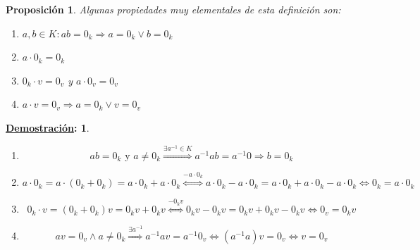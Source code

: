 \documentclass[10pt,a4paper,openright]{book}
\theoremstyle{break}
\newtheorem*{prop}{Proposición}
\newtheorem*{demo}{\underline{Demostración}:}
\begin{document}
\begin{prop}
Algunas propiedades muy elementales de esta definición son:
\begin{enumerate}
\item $a,b\in K: ab=0_k\Rightarrow a=0_k \vee b=0_k$

\item $a\cdot 0_k=0_k$

\item $0_k\cdot v=0_v$ y $a\cdot 0_v=0_v$

\item $a\cdot v=0_v\Rightarrow a=0_k \vee v=0_v$
\end{enumerate}
\end{prop}
\begin{demo}
\begin{enumerate}
\item 
$$ab=0_k\mbox{ y } a\neq 0_k \stackrel{\exists a^{-1}\in K}{\Rightarrow} a^{-1}ab=a^{-1}0\Rightarrow b=0_k$$

\item
$$a\cdot 0_k=a\cdot (0_k+0_k)=a\cdot 0_k+a\cdot 0_k\stackrel{-a\cdot 0_k}{\Leftrightarrow}a\cdot 0_k-a\cdot 0_k=a\cdot 0_k+a\cdot 0_k-a\cdot 0_k\Leftrightarrow 0_k=a\cdot 0_k$$

\item
$$0_k\cdot v=(0_k+0_k)v=0_kv+0_kv\stackrel{-0_kv}{\Leftrightarrow} 0_kv-0_kv=0_kv+0_kv-0_kv\Leftrightarrow 0_v=0_kv$$

\item
$$av=0_v\wedge a\neq 0_k\stackrel{\exists a^{-1}}{\Rightarrow} a^{-1}av=a^{-1}0_v\Leftrightarrow (a^{-1}a)v=0_v\Leftrightarrow v=0_v$$
\end{enumerate}
\end{demo}
\end{document}
